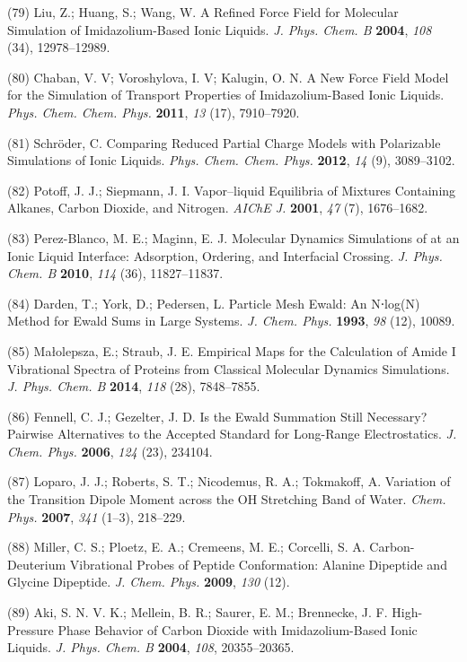 \documentclass[]{article}
\begin{document}
(79) Liu, Z.; Huang, S.; Wang, W. A Refined Force Field for Molecular
Simulation of Imidazolium-Based Ionic Liquids. \emph{J. Phys. Chem. B}
\textbf{2004}, \emph{108} (34), 12978--12989.

(80) Chaban, V. V; Voroshylova, I. V; Kalugin, O. N. A New Force Field
Model for the Simulation of Transport Properties of Imidazolium-Based
Ionic Liquids. \emph{Phys. Chem. Chem. Phys.} \textbf{2011}, \emph{13}
(17), 7910--7920.

(81) Schröder, C. Comparing Reduced Partial Charge Models with
Polarizable Simulations of Ionic Liquids. \emph{Phys. Chem. Chem. Phys.}
\textbf{2012}, \emph{14} (9), 3089--3102.

(82) Potoff, J. J.; Siepmann, J. I. Vapor--liquid Equilibria of Mixtures
Containing Alkanes, Carbon Dioxide, and Nitrogen. \emph{AIChE J.}
\textbf{2001}, \emph{47} (7), 1676--1682.

(83) Perez-Blanco, M. E.; Maginn, E. J. Molecular Dynamics Simulations
of  at an Ionic Liquid Interface: Adsorption,
Ordering, and Interfacial Crossing. \emph{J. Phys. Chem. B}
\textbf{2010}, \emph{114} (36), 11827--11837.

(84) Darden, T.; York, D.; Pedersen, L. Particle Mesh Ewald: An N⋅log(N)
Method for Ewald Sums in Large Systems. \emph{J. Chem. Phys.}
\textbf{1993}, \emph{98} (12), 10089.

(85) Małolepsza, E.; Straub, J. E. Empirical Maps for the Calculation of
Amide I Vibrational Spectra of Proteins from Classical Molecular
Dynamics Simulations. \emph{J. Phys. Chem. B} \textbf{2014}, \emph{118}
(28), 7848--7855.

(86) Fennell, C. J.; Gezelter, J. D. Is the Ewald Summation Still
Necessary? Pairwise Alternatives to the Accepted Standard for Long-Range
Electrostatics. \emph{J. Chem. Phys.} \textbf{2006}, \emph{124} (23),
234104.

(87) Loparo, J. J.; Roberts, S. T.; Nicodemus, R. A.; Tokmakoff, A.
Variation of the Transition Dipole Moment across the OH Stretching Band
of Water. \emph{Chem. Phys.} \textbf{2007}, \emph{341} (1--3), 218--229.

(88) Miller, C. S.; Ploetz, E. A.; Cremeens, M. E.; Corcelli, S. A.
Carbon-Deuterium Vibrational Probes of Peptide Conformation: Alanine
Dipeptide and Glycine Dipeptide. \emph{J. Chem. Phys.} \textbf{2009},
\emph{130} (12).

(89) Aki, S. N. V. K.; Mellein, B. R.; Saurer, E. M.; Brennecke, J. F.
High-Pressure Phase Behavior of Carbon Dioxide with Imidazolium-Based
Ionic Liquids. \emph{J. Phys. Chem. B} \textbf{2004}, \emph{108},
20355--20365.
\end{document}
